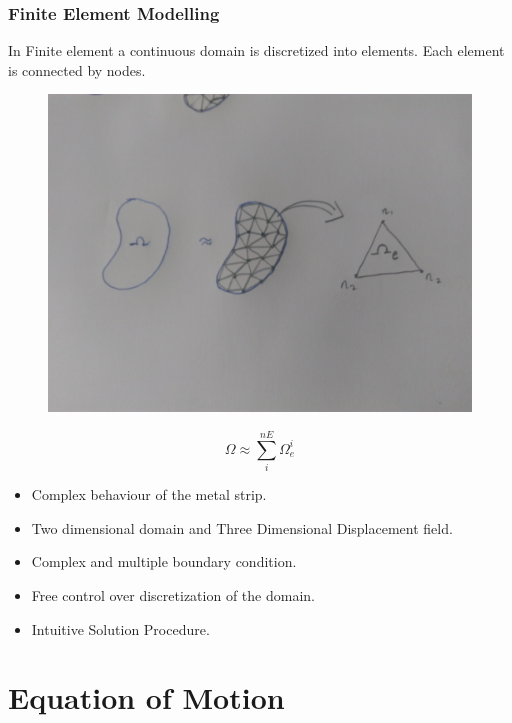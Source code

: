 \documentclass[9pt]{beamer}
\begin{document}
\begin{frame}
\frametitle{Finite Element Modelling}

In Finite element a  continuous domain is discretized into elements. Each element is connected by nodes.   
\begin{figure}[h!]
\centering
{}%
  \includegraphics[width=\linewidth,trim={10cm 30cm 8cm 30cm},clip]{FEM.jpg}
\endminipage
\end{figure} 
\begin{equation*}
\Omega \approx \sum_{i}^{nE} \Omega_e^i
\end{equation*}

\begin{itemize}
\item Complex behaviour of the metal strip.
\item Two dimensional domain and Three Dimensional Displacement field.
\item Complex and multiple boundary condition.
\item Free control over discretization of the domain.
\item Intuitive Solution Procedure.
\end{itemize}

\end{frame}

\section{Equation of Motion}
\end{document}
